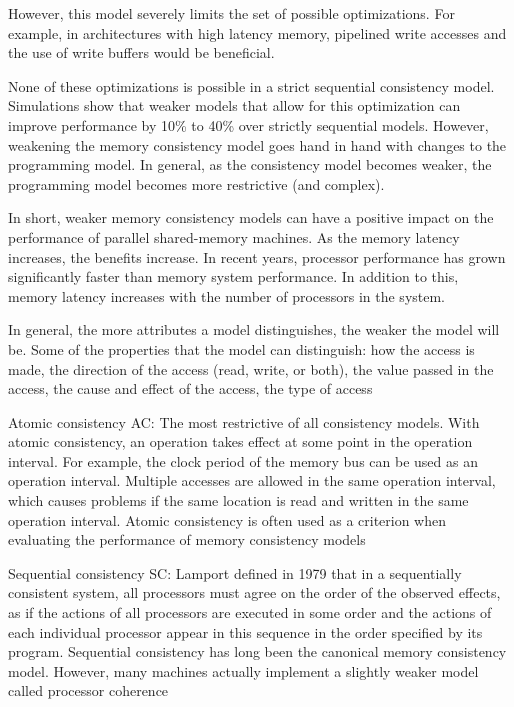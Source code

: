 \documentclass[a4paper,twoside]{scrbook}
\begin{document}
However, this model severely limits the set of possible optimizations. For example, in architectures with high latency memory, pipelined write accesses and the use of write buffers would be beneficial.

None of these optimizations is possible in a strict sequential consistency model. Simulations show that weaker models that allow for this optimization can improve performance by 10\% to 40\% over strictly sequential models. However, weakening the memory consistency model goes hand in hand with changes to the programming model. In general, as the consistency model becomes weaker, the programming model becomes more restrictive (and complex).

In short, weaker memory consistency models can have a positive impact on the performance of parallel shared-memory machines. As the memory latency increases, the benefits increase. In recent years, processor performance has grown significantly faster than memory system performance. In addition to this, memory latency increases with the number of processors in the system.
\par
In general, the more attributes a model distinguishes, the weaker the model will be. Some of the properties that the model can distinguish: how the access is made, the direction of the access (read, write, or both), the value passed in the access, the cause and effect of the access, the type of access
\par
Atomic consistency AC:
The most restrictive of all consistency models. With atomic consistency, an operation takes effect at some point in the operation interval. For example, the clock period of the memory bus can be used as an operation interval. Multiple accesses are allowed in the same operation interval, which causes problems if the same location is read and written in the same operation interval.
Atomic consistency is often used as a criterion when evaluating the performance of memory consistency models
\par
Sequential consistency SC:
Lamport defined in 1979 that in a sequentially consistent system, all processors must agree on the order of the observed effects, as if the actions of all processors are executed in some order and the actions of each individual processor appear in this sequence in the order specified by its program.
Sequential consistency has long been the canonical memory consistency model. However, many machines actually implement a slightly weaker model called processor coherence
\par
\par
\end{document}
